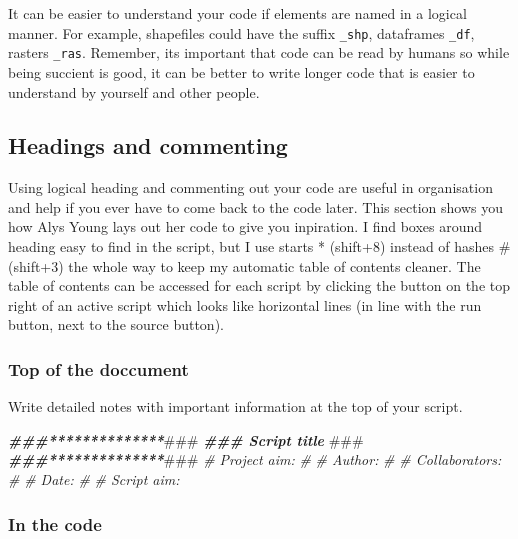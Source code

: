 \documentclass[
]{article}
\newenvironment{Shaded}{\begin{snugshade}}{\end{snugshade}}
\newcommand{\AlertTok}[1]{\textcolor[rgb]{0.94,0.16,0.16}{#1}}
\newcommand{\CommentTok}[1]{\textcolor[rgb]{0.56,0.35,0.01}{\textit{#1}}}
\newcommand{\DocumentationTok}[1]{\textcolor[rgb]{0.56,0.35,0.01}{\textbf{\textit{#1}}}}
\begin{document}
It can be easier to understand your code if elements are named in a
logical manner. For example, shapefiles could have the suffix
\texttt{\_shp}, dataframes \texttt{\_df}, rasters \texttt{\_ras}.
Remember, its important that code can be read by humans so while being
succient is good, it can be better to write longer code that is easier
to understand by yourself and other people.

\hypertarget{headings-and-commenting}{%
\subsection{Headings and commenting}\label{headings-and-commenting}}

Using logical heading and commenting out your code are useful in
organisation and help if you ever have to come back to the code later.
This section shows you how Alys Young lays out her code to give you
inpiration. I find boxes around heading easy to find in the script, but
I use starts * (shift+8) instead of hashes \# (shift+3) the whole way to
keep my automatic table of contents cleaner. The table of contents can
be accessed for each script by clicking the button on the top right of
an active script which looks like horizontal lines (in line with the run
button, next to the source button).

\hypertarget{top-of-the-doccument}{%
\subsubsection{Top of the doccument}\label{top-of-the-doccument}}

Write detailed notes with important information at the top of your
script.

\begin{Shaded}
\begin{Highlighting}[]
\DocumentationTok{\#\#\#**************}\AlertTok{\#\#\#}
\DocumentationTok{\#\#\# Script title }\AlertTok{\#\#\#}
\DocumentationTok{\#\#\#**************}\AlertTok{\#\#\#}
\CommentTok{\# Project aim:}
\CommentTok{\#}
\CommentTok{\# Author:}
\CommentTok{\#}
\CommentTok{\# Collaborators:}
\CommentTok{\#}
\CommentTok{\# Date:}
\CommentTok{\#}
\CommentTok{\# Script aim:}
\end{Highlighting}
\end{Shaded}

\hypertarget{in-the-code}{%
\subsubsection{In the code}\label{in-the-code}}
\end{document}
